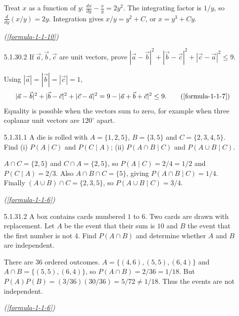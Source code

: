 \begin{enumerate}[label={},leftmargin=1.15cm,labelwidth=1.0cm,labelsep=0.15cm,itemindent=0pt,listparindent=0pt,itemsep=\baselineskip,parsep=0pt,topsep=0pt]
Treat $x$ as a function of $y$: $\frac{dx}{dy}-\frac{x}{y}=2y^2$. The integrating factor is $1/y$, so $\frac{d}{dy}(x/y)=2y$. Integration gives $x/y=y^2+C$, or $\boxed{x=y^3+Cy}$.\par\noindent\hfill\mbox{\textit{(\ref{formula-1-1-10})}}\par

\item[5.1.30.2] If $\vec a,\vec b,\vec c$ are unit vectors, prove $|\vec a-\vec b|^2+|\vec b-\vec c|^2+|\vec c-\vec a|^2\le9$.

\vspace{0.6em}\par\solution


Using $|\vec a|=|\vec b|=|\vec c|=1$,
\begin{equation*}
|\vec a-\vec b|^2+|\vec b-\vec c|^2+|\vec c-\vec a|^2
=9-|\vec a+\vec b+\vec c|^2\le9.
\tag*{(\ref{formula-1-1-7})}\end{equation*}
Equality is possible when the vectors sum to zero, for example when three coplanar unit vectors are $120^\circ$ apart.

\item[5.1.31.1] A die is rolled with $A=\{1,2,5\}$, $B=\{3,5\}$ and $C=\{2,3,4,5\}$. Find (i) $P(A\mid C)$ and $P(C\mid A)$; (ii) $P(A\cap B\mid C)$ and $P(A\cup B\mid C)$.

\vspace{0.6em}\par\solution


$A\cap C=\{2,5\}$ and $C\cap A=\{2,5\}$, so $P(A\mid C)=2/4=1/2$ and $P(C\mid A)=2/3$. Also $A\cap B\cap C=\{5\}$, giving $P(A\cap B\mid C)=1/4$. Finally $(A\cup B)\cap C=\{2,3,5\}$, so $P(A\cup B\mid C)=3/4$.\par\noindent\hfill\mbox{\textit{(\ref{formula-1-1-6})}}\par

\item[5.1.31.2] A box contains cards numbered $1$ to $6$. Two cards are drawn with replacement. Let $A$ be the event that their sum is $10$ and $B$ the event that the first number is not $4$. Find $P(A\cap B)$ and determine whether $A$ and $B$ are independent.

\vspace{0.6em}\par\solution


There are $36$ ordered outcomes. $A=\{(4,6),(5,5),(6,4)\}$ and $A\cap B=\{(5,5),(6,4)\}$, so $P(A\cap B)=2/36=1/18$. But $P(A)P(B)=(3/36)(30/36)=5/72\ne1/18$. Thus the events are not independent.\par\noindent\hfill\mbox{\textit{(\ref{formula-1-1-6})}}\par


\end{enumerate}
